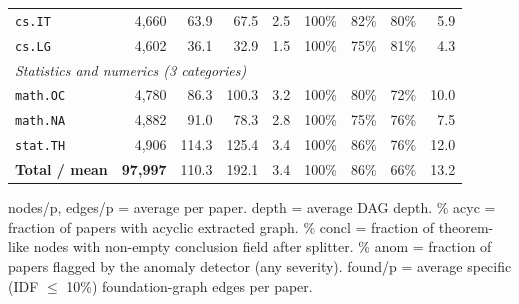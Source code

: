 \begin{table}[h]
\begin{tabular}{@{}lrrrrrrrr@{}}
\texttt{cs.IT} & 4{,}660 & 63.9 & 67.5 & 2.5 & 100\% & 82\% & 80\% & 5.9 \\
\texttt{cs.LG} & 4{,}602 & 36.1 & 32.9 & 1.5 & 100\% & 75\% & 81\% & 4.3 \\
\midrule
\multicolumn{9}{l}{\textit{Statistics and numerics (3 categories)}} \\
\texttt{math.OC} & 4{,}780 & 86.3 & 100.3 & 3.2 & 100\% & 80\% & 72\% & 10.0 \\
\texttt{math.NA} & 4{,}882 & 91.0 & 78.3 & 2.8 & 100\% & 75\% & 76\% & 7.5 \\
\texttt{stat.TH} & 4{,}906 & 114.3 & 125.4 & 3.4 & 100\% & 86\% & 76\% & 12.0 \\
\midrule
\textbf{Total / mean} & \textbf{97{,}997} & 110.3 & 192.1 & 3.4 & 100\% & 86\% & 66\% & 13.2 \\
\bottomrule
\end{tabular}

\vspace{0.4em}
\footnotesize
nodes/p, edges/p = average per paper. depth = average DAG depth. \% acyc = fraction of papers with acyclic extracted graph. \% concl = fraction of theorem-like nodes with non-empty conclusion field after splitter. \% anom = fraction of papers flagged by the anomaly detector (any severity). found/p = average specific (IDF $\leq$ 10\%) foundation-graph edges per paper.
\end{table}
